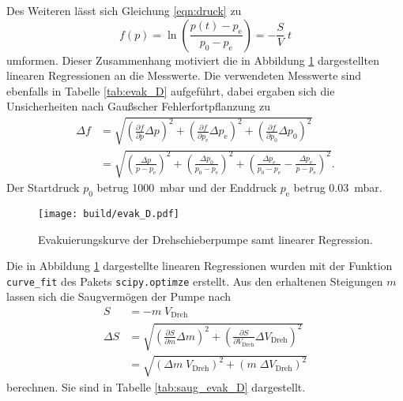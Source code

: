 Des Weiteren lässt sich Gleichung \eqref{eqn:druck} zu
\begin{equation*}
  f\left(p\right) = \ln\left(\frac{p(t)-p_\text{e}}{p_0-p_\text{e}}\right) =
  - \frac{S}{V} \;t
\end{equation*}
umformen. Dieser Zusammenhang motiviert die in Abbildung \ref{fig:evak_D}
dargestellten linearen Regressionen an die Messwerte. Die verwendeten Messwerte
sind ebenfalls in Tabelle \ref{tab:evak_D} aufgeführt, dabei ergaben sich die
Unsicherheiten nach Gaußscher Fehlerfortpflanzung zu
\begin{align*}
  \Delta f &=
  \sqrt{\left(\frac{\partial f}{\partial p} \Delta p\right)^2 +
  \left(\frac{\partial f}{\partial p_\text{e}} \Delta p_\text{e}\right)^2 +
  \left(\frac{\partial f}{\partial p_\text{0}} \Delta p_\text{0}\right)^2} \\
  &=
  \sqrt{\left(\frac{\Delta p}{p - p_\text{e}}\right)^2 +
  \left(\frac{\Delta p_0}{p_0 - p_\text{e}}\right)^2 +
  \left(\frac{\Delta p_\text{e}}{p_0 - p_\text{e}} -
  \frac{\Delta p_\text{e}}{p - p_\text{e}}\right)^2}.
\end{align*}
Der Startdruck $p_0$ betrug \SI{1000}{\milli\bar} und der Enddruck $p_\text{e}$
betrug \SI{0.03}{\milli\bar}.

\begin{figure}
  \centering
  \texttt{[image: build/evak\_D.pdf]}
  \caption{Evakuierungskurve der Drehschieberpumpe samt linearer Regression.}
  \label{fig:evak_D}
\end{figure}

Die in Abbildung \ref{fig:evak_D} dargestellte linearen Regressionen wurden
mit der Funktion \texttt{curve\_fit} des Pakets \texttt{scipy.optimze} \cite{scipy}
erstellt. Aus den erhaltenen Steigungen $m$ lassen sich die Saugvermögen der Pumpe
nach
\begin{align*}
    S &= - m \; V_\text{Dreh} \\
    \Delta S &=
    \sqrt{\left(\frac{\partial S}{\partial m} \Delta m\right)^2 +
    \left(\frac{\partial S}{\partial V_\text{Dreh}} \Delta V_\text{Dreh}\right)^2} \\
    &=
    \sqrt{\left(\Delta m \; V_\text{Dreh}\right)^2 +
    \left(m \; \Delta V_\text{Dreh}\right)^2}
\end{align*}
berechnen. Sie sind in Tabelle \ref{tab:saug_evak_D} dargestellt.


\FloatBarrier


